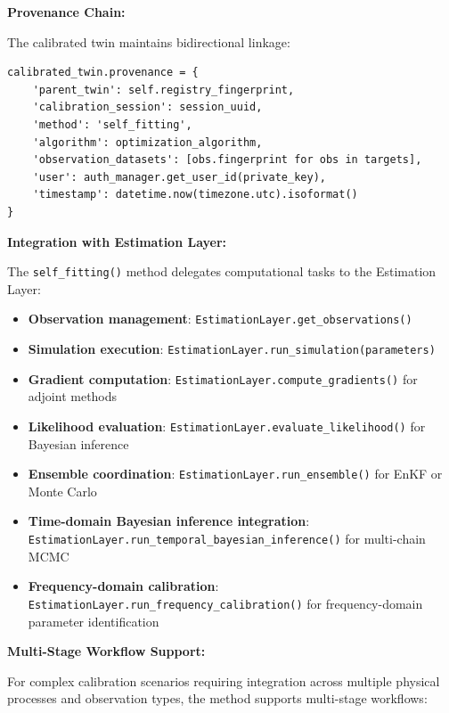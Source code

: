 \textbf{Provenance Chain:}

The calibrated twin maintains bidirectional linkage:
\begin{verbatim}
calibrated_twin.provenance = {
    'parent_twin': self.registry_fingerprint,
    'calibration_session': session_uuid,
    'method': 'self_fitting',
    'algorithm': optimization_algorithm,
    'observation_datasets': [obs.fingerprint for obs in targets],
    'user': auth_manager.get_user_id(private_key),
    'timestamp': datetime.now(timezone.utc).isoformat()
}
\end{verbatim}

\textbf{Integration with Estimation Layer:}

The \texttt{self\_fitting()} method delegates computational tasks to the Estimation Layer:

\begin{itemize}
    \item \textbf{Observation management}: \texttt{EstimationLayer.get\_observations()}
    \item \textbf{Simulation execution}: \texttt{EstimationLayer.run\_simulation(parameters)}
    \item \textbf{Gradient computation}: \texttt{EstimationLayer.compute\_gradients()} for adjoint methods
    \item \textbf{Likelihood evaluation}: \texttt{EstimationLayer.evaluate\_likelihood()} for Bayesian inference
    \item \textbf{Ensemble coordination}: \texttt{EstimationLayer.run\_ensemble()} for EnKF or Monte Carlo
    \item \textbf{Time-domain Bayesian inference integration}: \texttt{EstimationLayer.run\_temporal\_bayesian\_inference()} for multi-chain MCMC
    \item \textbf{Frequency-domain calibration}: \texttt{EstimationLayer.run\_frequency\_calibration()} for frequency-domain parameter identification
\end{itemize}

\textbf{Multi-Stage Workflow Support:}

For complex calibration scenarios requiring integration across multiple physical processes and observation types, the method supports multi-stage workflows:

